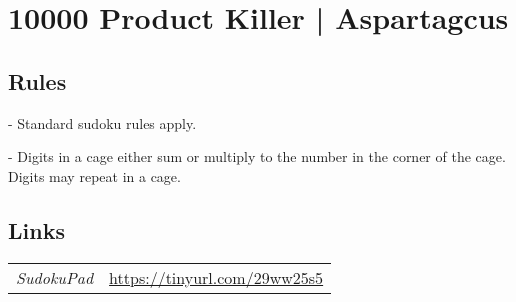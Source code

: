 \section[10000 Product Killer | Aspartagcus {[\emph{Product Killer Sudoku}]}]{10000 Product Killer | {\normalfont Aspartagcus}}
\label{sec:53-10000-product-killer-aspartagcus}

\subsection*{Rules}
\begin{markdown}
- Standard sudoku rules apply.

- Digits in a cage either sum or multiply to the number in the corner of the cage. Digits may repeat in a cage.
\end{markdown}
\subsection*{Links}
\begin{tabularx}{\textwidth}{l X}
\emph{SudokuPad} & \url{https://tinyurl.com/29ww25s5} \\
\end{tabularx}
\pagebreak
